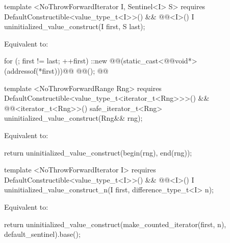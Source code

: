 {\color{addclr}
\begin{codeblock}
template <NoThrowForwardIterator I, Sentinel<I> S>
  requires DefaultConstructible<value_type_t<I>>() &&
           @@<I>()
    I uninitialized_value_construct(I first, S last);
\end{codeblock}

\setcounter{Paras}{0}
\pnum
\effects Equivalent to:
} %

\begin{codeblock}
        for (; first != last; ++first)
          ::new @@(static_cast<@@void*>(addressof(*first)))@\added{)}@
            @@();
        @@
\end{codeblock}

{\color{addclr}
\begin{codeblock}
template <NoThrowForwardRange Rng>
  requires DefaultConstructible<value_type_t<iterator_t<Rng>>>() &&
           @@<iterator_t<Rng>>()
    safe_iterator_t<Rng>
    uninitialized_value_construct(Rng&& rng);
\end{codeblock}

\pnum
\effects Equivalent to:
\begin{codeblock}
        return uninitialized_value_construct(begin(rng), end(rng));
\end{codeblock}

\begin{codeblock}
template <NoThrowForwardIterator I>
  requires DefaultConstructible<value_type_t<I>>() &&
           @@<I>()
    I uninitialized_value_construct_n(I first, difference_type_t<I> n);
\end{codeblock}

\pnum
\effects Equivalent to:
\begin{codeblock}
        return uninitialized_value_construct(make_counted_iterator(first, n),
                                             default_sentinel{}).base();
\end{codeblock}
} %


